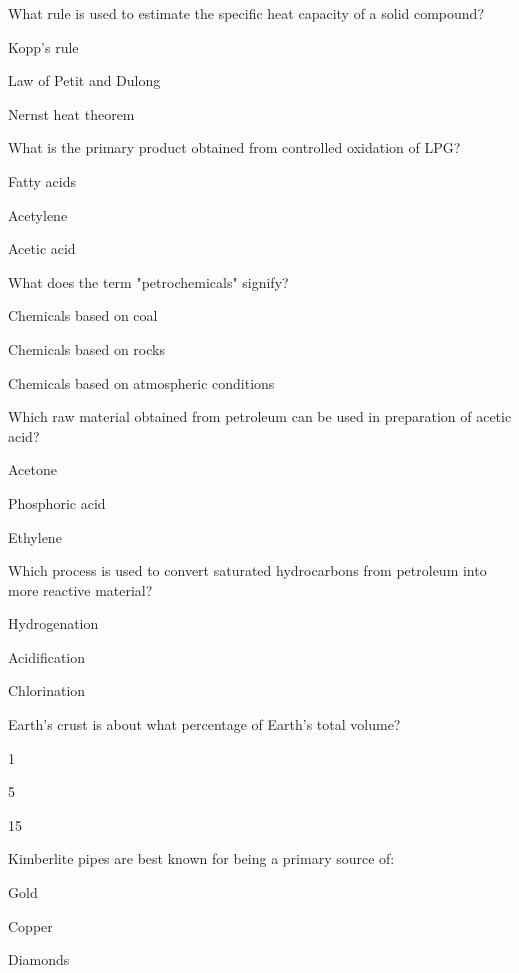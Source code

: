 
\begin{enhancedmcq}{What rule is used to estimate the specific heat capacity of a solid compound?}
\item Kopp's rule
\item Law of Petit and Dulong
\item Nernst heat theorem

\end{enhancedmcq}
\begin{enhancedmcq}{What is the primary product obtained from controlled oxidation of LPG?}
\item Fatty acids
\item Acetylene
\item Acetic acid

\end{enhancedmcq}
\begin{enhancedmcq}{What does the term "petrochemicals" signify?}
\item Chemicals based on coal
\item Chemicals based on rocks
\item Chemicals based on atmospheric conditions

\end{enhancedmcq}
\begin{enhancedmcq}{Which raw material obtained from petroleum can be used in preparation of acetic acid?}
\item Acetone
\item Phosphoric acid
\item Ethylene

\end{enhancedmcq}
\begin{enhancedmcq}{Which process is used to convert saturated hydrocarbons from petroleum into more reactive material?}
\item Hydrogenation
\item Acidification
\item Chlorination

\end{enhancedmcq}
\begin{enhancedmcq}{Earth's crust is about what percentage of Earth's total volume?}
\item 1%
\item 5%
\item 15%

\end{enhancedmcq}
\begin{enhancedmcq}{Kimberlite pipes are best known for being a primary source of:}
\item Gold
\item Copper
\item Diamonds

\end{enhancedmcq}

